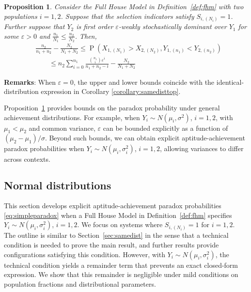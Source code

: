 \documentclass[12pt]{article}
\DeclareMathOperator*{\Prob}{P}
\newtheorem{prop}[theorem]{Proposition}
\begin{document}
\begin{prop} \label{prop:weakstodom}
Consider the Full House Model in Definition~\ref{def:fhm} with two populations $i=1,2$. Suppose that the selection indicators satisfy $S_{i,(N_i)} = 1$. Further suppose that $Y_2$ is first order $\varepsilon$-weakly stochastically dominant over $Y_1$ for some $\varepsilon > 0$ and $\frac{n_1}{N_1} \leq \frac{n_2}{N_2}$. Then,
\begin{equation} \label{eq:paradox2}
\begin{split}
  &\frac{n_2}{n_1 + n_2} - \frac{N_2}{N_1 + N_2} \leq \Prob\left(X_{1,(N_1)} > X_{2,(N_2)}, Y_{1,(n_1)} < Y_{2,(n_2)}\right) \\
  &\qquad\leq n_2\sum_{i=0}^{n_1} \frac{{n_1 \choose i}\varepsilon^i}{n_1+n_2-i}- \frac{N_2}{N_1 + N_2}
\end{split}
\end{equation}
\end{prop}

\noindent \textbf{Remarks}:
When $\varepsilon=0$, the upper and lower bounds coincide with the identical-distribution expression in Corollary \ref{corollary:samedisttop}. 

Proposition~\ref{prop:weakstodom} provides bounds on the paradox probability under general achievement distributions. For example, when $Y_i \sim N(\mu_i, \sigma^2)$, $i = 1,2$, with $\mu_1 < \mu_2$ and common variance, $\varepsilon$ can be bounded explicitly as a function of $(\mu_2 - \mu_1)/\sigma$. Beyond such bounds, we can obtain explicit aptitude-achievement paradox probabilities when $Y_i \sim N(\mu_i,\sigma_i^2)$, $i = 1,2$, allowing variances to differ across contexts.


\subsection{Normal distributions}
\label{subsec:normal}


This section develops explicit aptitude-achievement paradox probabilities \eqref{eq:simpleparadox} when a Full House Model in Definition~\ref{def:fhm} specifies $Y_i \sim N(\mu_i,\sigma_i^2)$, $i = 1,2$. We focus on systems where $S_{i,(N_i)} = 1$ for $i = 1,2$. The outline is similar to Section~\ref{sec:samedist} in the sense that a technical condition is needed to prove the main result, and further results provide configurations satisfying this condition. However, with $Y_i \sim N(\mu_i,\sigma_i^2)$, the technical condition yields a remainder term that prevents an exact closed-form expression. We show that this remainder is negligible under mild conditions on population fractions and distributional parameters.
\end{document}
